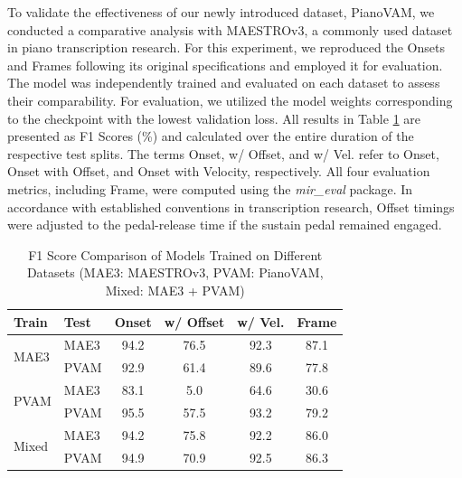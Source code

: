 \documentclass{article}
\begin{document}
To validate the effectiveness of our newly introduced dataset, PianoVAM, we conducted a comparative analysis with MAESTROv3, a commonly used dataset in piano transcription research. For this experiment, we reproduced the Onsets and Frames\cite{ISMIR18Hawthorne} following its original specifications and employed it for evaluation. The model was independently trained and evaluated on each dataset to assess their comparability. For evaluation, we utilized the model weights corresponding to the checkpoint with the lowest validation loss. All results in Table \ref{tab:performance_comparison} are presented as F1 Scores (\%) and calculated over the entire duration of the respective test splits. The terms Onset, w/ Offset, and w/ Vel. refer to Onset, Onset with Offset, and Onset with Velocity, respectively. All four evaluation metrics, including Frame, were computed using the \textit{mir\_eval} package. In accordance with established conventions in transcription research, Offset timings were adjusted to the pedal-release time if the sustain pedal remained engaged.
\begin{table}[htbp]
\centering
\small
\caption{F1 Score Comparison of Models Trained on Different Datasets (MAE3: MAESTROv3, PVAM: PianoVAM, Mixed: MAE3 + PVAM)}
\label{tab:performance_comparison}
\begin{tabular}{l l c c c c}
\toprule
\textbf{Train} & \textbf{Test} & \textbf{Onset} & \textbf{w/ Offset} & \textbf{w/ Vel.} & \textbf{Frame} \\
\midrule
\multirow{2}{*}{MAE3} & MAE3 & 94.2 & 76.5 & 92.3 & 87.1 \\
                           & PVAM   & 92.9 & 61.4 & 89.6 & 77.8 \\
\midrule
\multirow{2}{*}{PVAM}  & MAE3  & 83.1 & 5.0   & 64.6   & 30.6   \\
                           & PVAM   & 95.5 & 57.5 & 93.2 & 79.2 \\
\midrule
\multirow{2}{*}{Mixed} & MAE3  & 94.2 & 75.8 & 92.2  & 86.0 \\
                           & PVAM   & 94.9 & 70.9 & 92.5 & 86.3 \\
\bottomrule
\end{tabular}
\end{table}

\end{document}

